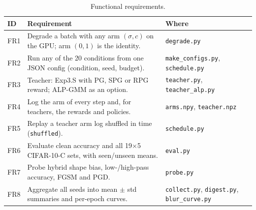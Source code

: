 \documentclass[a4paper,12pt]{report}
\newcommand{\cond}[1]{\texttt{#1}}
\begin{document}
\begin{table}[htbp]
\caption{Functional requirements.}
\label{tab:fr}
\begin{center}
\footnotesize
\begin{tabular}{|l|P{8cm}|P{4.2cm}|} \hline
\textbf{ID} & \textbf{Requirement} & \textbf{Where} \\ \hline
FR1 & Degrade a batch with any arm $(\sigma, c)$ on the GPU; arm $(0,1)$ is the identity. & \texttt{degrade.py} \\
FR2 & Run any of the 20 conditions from one JSON config (condition, seed, budget). & \texttt{make\_configs.py}, \texttt{schedule.py} \\
FR3 & Teacher: Exp3.S with PG, SPG or RPG reward; ALP-GMM as an option. & \texttt{teacher.py}, \texttt{teacher\_alp.py} \\
FR4 & Log the arm of every step and, for teachers, the rewards and policies. & \texttt{arms.npy}, \texttt{teacher.npz} \\
FR5 & Replay a teacher arm log shuffled in time (\cond{shuffled}). & \texttt{schedule.py} \\
FR6 & Evaluate clean accuracy and all 19$\times$5 CIFAR-10-C sets, with seen/unseen means. & \texttt{eval.py} \\
FR7 & Probe hybrid shape bias, low-/high-pass accuracy, FGSM and PGD. & \texttt{probe.py} \\
FR8 & Aggregate all seeds into mean $\pm$ std summaries and per-epoch curves. & \texttt{collect.py}, \texttt{digest.py}, \texttt{blur\_curve.py} \\ \hline
\end{tabular}
\end{center}
\end{table}
\end{document}
